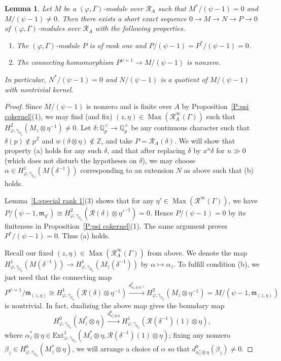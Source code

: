 \documentclass[12pt]{article}
\newtheorem{lemma}[theorem]{Lemma}
\theoremstyle{definition}
\numberwithin{equation}{theorem}
\newcommand{\calR}{\mathcal{R}}
\newcommand{\gothm}{\mathfrak{m}}
\newcommand{\QQ}{\mathbb{Q}}
\newcommand{\ZZ}{\mathbb{Z}}
\def\Qp{\QQ_p}
\DeclareMathOperator{\Max}{Max}
\begin{document}
\begin{lemma} \label{L:devissage}
Let $M$ be a $(\varphi, \Gamma)$-module over $\calR_A$ such that $M^*/(\psi-1)=0$ and $M/(\psi-1)\neq 0$.
Then there exists a short exact sequence $0 \to M \to N \to P \to 0$ of $(\varphi, \Gamma)$-modules
over $\calR_A$ with the following properties.
\begin{enumerate}
\item[(a)]
The $(\varphi, \Gamma)$-module $P$ is of rank one and $P/(\psi-1) = P^*/(\psi-1)=0$.
\item[(b)]
The connecting homomorphism $P^{\psi=1} \to M/(\psi-1)$ is nonzero.
\end{enumerate}
In particular, $N^*/(\psi-1)=0$ and $N/(\psi-1)$ is a quotient of
$M/(\psi-1)$ with nontrivial kernel.
\end{lemma}
\begin{proof}
Since $M / (\psi-1)$ is nonzero and is finite over $A$ by
Proposition~\ref{P:psi cokernel}(1), we may find (and fix) $(z,\eta)
\in \Max(\calR_A^\infty(\Gamma))$ such that $H^2_{\varphi,
  \gamma_{\Qp}}(M_z \otimes \eta^{-1}) \neq 0$.  Let $\delta: \Qp^\times
\to \Qp^\times$ be any continuous character such that $\delta(p) \notin p^\ZZ$
and $w(\delta \otimes \eta) \notin \ZZ$, and take $P =
\calR_A(\delta)$.  We will show that property (a) holds for any such
$\delta$, and that after replacing $\delta$ by $x^n\delta$ for $n \gg
0$ (which does not disturb the hypotheses on $\delta$), we may choose
$\alpha \in H^1_{\varphi,\gamma_{\Qp}}(M(\delta^{-1}))$ corresponding
to an extension $N$ as above such that (b) holds.

Lemma~\ref{L:special rank 1}(3) shows that for any $\eta' \in
\Max(\calR^\infty(\Gamma))$, we have $P / (\psi-1, \gothm_{\eta'})
\cong H^2_{\varphi, \gamma_{\Qp}}(\calR(\delta) \otimes \eta'^{-1}) =
0 $.  Hence $P / (\psi-1) = 0$ by its finiteness in
Proposition~\ref{P:psi cokernel}(1).  The same argument proves $P^* /
(\psi-1) = 0$.  Thus (a) holds.

Recall our fixed $(z,\eta) \in \Max (\calR_A^\infty(\Gamma))$ from
above.  We denote the map $H^1_{\varphi,\gamma_{\Qp}}(M(\delta^{-1}))
\to H^1_{\varphi,\gamma_{\Qp}}(M_z(\delta^{-1}))$ by $\alpha \mapsto
\alpha_z$.  To fulfill condition (b), we just need that the connecting
map
\[
P^{\psi=1} / \gothm_{(z,\eta)} \cong H^1_{\varphi,
\gamma_{\Qp}}(\calR(\delta) \otimes \eta^{-1})
\xrightarrow{d^1_{\alpha_z \otimes \eta^{-1}}}
H^2_{\varphi, \gamma_{\Qp}}(M_z
\otimes \eta^{-1}) = M/(\psi-1, \gothm_{(z,\eta)})
\]
is nontrivial.  In fact, dualizing the above map gives the boundary
map
\[
H^0_{\varphi, \gamma_{\Qp}}(M^*_z \otimes \eta)
\xrightarrow{d^0_{\alpha_z^* \otimes \eta}}
H^1_{\varphi, \gamma_{\Qp}}(\calR(\delta^{-1})(1) \otimes \eta),
\]
where $\alpha_z^* \otimes \eta \in
\mathrm{Ext}^1_{\varphi,\gamma_{\Qp}}(M^*_z \otimes \eta,
\calR(\delta^{-1})(1) \otimes \eta)$; fixing any nonzero $\beta_z \in
H^0_{\varphi, \gamma_{\Qp}}(M^*_z \otimes \eta)$, we will arrange a
choice of $\alpha$ so that $d^0_{\alpha_z^* \otimes \eta}(\beta_z)
\neq 0$.


\end{proof}
\end{document}
